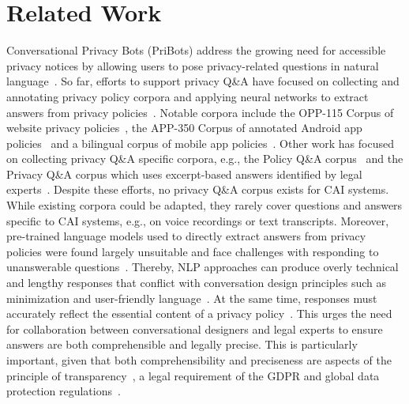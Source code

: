 \section{Related Work}
Conversational Privacy Bots (PriBots) address the growing need for accessible privacy notices by allowing users to pose privacy-related questions in natural language~\cite{harkousPriBotsConversationalPrivacy, grunewald2023enabling}. %
So far, efforts to support privacy Q\&A have focused on collecting and annotating privacy policy corpora and applying neural networks to extract answers from privacy policies~\cite{wilsonCreationAnalysisWebsite2016, ravichanderQuestionAnsweringPrivacy2019, ahmadPolicyQAReadingComprehension2020a, aroraTaleTwoRegulatory, sathyendraHelpingUsersUnderstanda}. Notable corpora include the OPP-115 Corpus of website privacy policies~\cite{wilsonCreationAnalysisWebsite2016}, the APP-350 Corpus of annotated Android app policies~\cite{zimmeck2019maps} and a bilingual corpus of mobile app policies~\cite{aroraTaleTwoRegulatory}. Other work has focused on collecting privacy Q\&A specific corpora, e.g., the Policy Q\&A corpus~\cite{ahmadPolicyQAReadingComprehension2020a} and the Privacy Q\&A corpus which uses excerpt-based answers identified by legal experts~\cite{ravichanderQuestionAnsweringPrivacy2019}. Despite these efforts, no privacy Q\&A corpus exists for CAI systems. While existing corpora could be adapted, they rarely cover questions and answers specific to CAI systems, e.g., on voice recordings or text transcripts.
Moreover, pre-trained language models used to directly extract answers from privacy policies were found largely unsuitable and face challenges with responding to unanswerable questions~\cite{ravichanderQuestionAnsweringPrivacy2019, ahmadPolicyQAReadingComprehension2020a, ravichanderBreakingWallsText2021}. Thereby, NLP approaches can produce overly technical and lengthy responses that conflict with conversation design principles such as minimization and user-friendly language~\cite{MooreNCF}. At the same time, responses must accurately reflect the essential content of a privacy policy~\cite{harkousPriBotsConversationalPrivacy}. This urges the need for collaboration between conversational designers and legal experts to ensure answers are both comprehensible and legally precise. This is particularly important, given that both comprehensibility and preciseness are aspects of the principle of transparency~\cite{Article29WP2018}, a legal requirement of the GDPR and global data protection regulations~\cite{gunst2021brusselseffect, ProtectingConsumerPrivacy2012}. 

